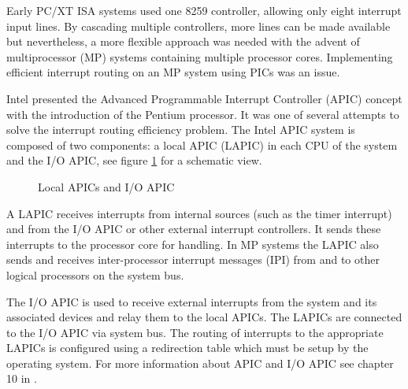 Early PC/XT ISA systems used one 8259 controller, allowing only eight
interrupt input lines. By cascading multiple controllers, more lines can be made
available but nevertheless, a more flexible approach was needed with the advent
of multiprocessor (MP) systems containing multiple processor cores.
Implementing efficient interrupt routing on an MP system using PICs was an
issue.

Intel presented the Advanced Programmable Interrupt Controller
(APIC) concept with the introduction of the Pentium processor. It
was one of several attempts to solve the interrupt routing efficiency problem.
The Intel APIC system is composed of two components: a local APIC
(LAPIC) in each CPU of the system and the I/O APIC, see figure
\ref{fig:apic} for a schematic view.

\begin{figure}[h]
	\centering
	
	\caption{Local APICs and I/O APIC}
	\label{fig:apic}
\end{figure}

A LAPIC receives interrupts from internal sources (such as the timer interrupt)
and from the I/O APIC or other external interrupt controllers. It sends these
interrupts to the processor core for handling. In MP systems the LAPIC also
sends and receives inter-processor interrupt messages (IPI) from and
to other logical processors on the system bus.

The I/O APIC is used to receive external interrupts from the system and its
associated devices and relay them to the local APICs. The LAPICs are connected
to the I/O APIC via system bus. The routing of interrupts to the appropriate
LAPICs is configured using a redirection table which must be setup by the
operating system. For more information about APIC and I/O APIC see chapter 10 in
\cite{IntelSDM}.
